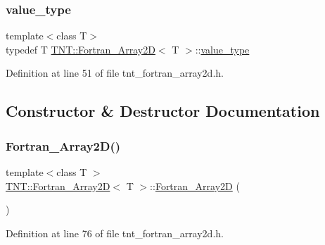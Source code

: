 \subsubsection{\texorpdfstring{value\+\_\+type}{value\_type}}
{\footnotesize\ttfamily template$<$class T$>$ \\
typedef T \hyperlink{classTNT_1_1Fortran__Array2D}{T\+N\+T\+::\+Fortran\+\_\+\+Array2D}$<$ T $>$\+::\hyperlink{classTNT_1_1Fortran__Array2D_a498268efd59880dbd352e67e283ea042}{value\+\_\+type}}



Definition at line 51 of file tnt\+\_\+fortran\+\_\+array2d.\+h.



\subsection{Constructor \& Destructor Documentation}
\mbox{\label{classTNT_1_1Fortran__Array2D_a6c439794238043682b4b5901521534ac}} 
\subsubsection{\texorpdfstring{Fortran\+\_\+\+Array2\+D()}{Fortran\_Array2D()}\hspace{0.1cm}{\footnotesize\ttfamily [1/5]}}
{\footnotesize\ttfamily template$<$class T $>$ \\
\hyperlink{classTNT_1_1Fortran__Array2D}{T\+N\+T\+::\+Fortran\+\_\+\+Array2D}$<$ T $>$\+::\hyperlink{classTNT_1_1Fortran__Array2D}{Fortran\+\_\+\+Array2D} (\begin{DoxyParamCaption}{ }\end{DoxyParamCaption})}



Definition at line 76 of file tnt\+\_\+fortran\+\_\+array2d.\+h.

\mbox{\label{classTNT_1_1Fortran__Array2D_af5d192c5865a587f3e49de6e321c6483}} 
